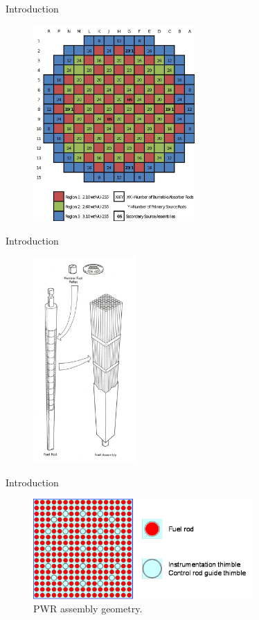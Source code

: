 \documentclass[presentation]{beamer}
\begin{document}
\begin{frame}[label={sec:orgheadline4}]{Introduction}
\begin{figure}
  \centering
  \includegraphics[width=0.55\textwidth]{assemblyGrid.png}
\end{figure}
\end{frame}
\begin{frame}[label={sec:orgheadline5}]{Introduction}
\begin{figure}
  \centering
  \includegraphics[width=0.35\textwidth]{NEAT22-Figure-1-bwr-fuel-c.png}
\end{figure}
\end{frame}
\begin{frame}[label={sec:orgheadline6}]{Introduction}
\begin{figure}
  \centering
  \includegraphics[width=0.75\textwidth]{pwr_fa_17x17.png}
  \caption{PWR assembly geometry.}
\end{figure}
\end{frame}
\end{document}
